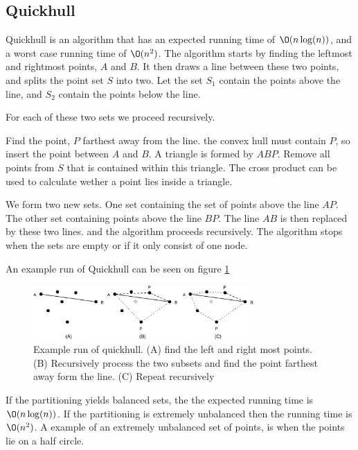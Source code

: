 \documentclass[10pt]{article}
\begin{document}


\subsection{Quickhull} %
\label{sub:quickhull}
Quickhull is an algorithm that has an expected running time of $\O(n\log(n))$, and a worst case running time of $\O(n^2)$. The algorithm starts by finding the leftmost and rightmost points, $A$ and $B$. It then draws a line between these two points, and splits the point set $S$ into two. Let the set $S_1$ contain the points above the line, and $S_2$ contain the points below the line. 

For each of these two sets we proceed recursively.

Find the point, $P$ farthest away from the line. the convex hull must contain $P$, so insert the point between $A$ and $B$. A triangle is formed by $ABP$. Remove all points from $S$ that is contained within this triangle. The cross product can be used to calculate wether a point lies inside a triangle.                                                                                        

We form two new sets. One set containing the set of points above the line $AP$. The other set containing points above the line $BP$. The line $AB$ is then replaced by these two lines. and the algorithm proceeds recursively. The algorithm stops when the sets are empty or if it only consist of one node.

An example run of Quickhull can be seen on figure \ref{fig18} 

\begin{figure}[ht]
\centering
\includegraphics[width=0.75\textwidth]{figures/fig18.pdf}
\caption{Example run of quickhull. (A) find the left and right most points. (B) Recursively process the two subsets and find the point farthest away form the line. (C) Repeat recursively}
\label{fig18}
\end{figure}


If the partitioning yields balanced sets, the the expected running time is $\O(n\log(n))$. If the partitioning is extremely unbalanced then the running time is $\O(n^2)$. A example of an extremely unbalanced set of points, is when the points lie on a half circle.
\end{document}

